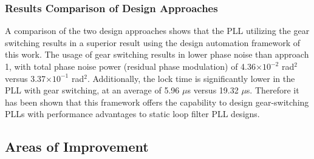 \subsubsection{Results Comparison of Design Approaches}
A comparison of the two design approaches shows that the PLL utilizing the gear switching results in a superior result using the design automation framework of this work. The usage of gear switching results in lower phase noise than approach 1, with total phase noise power (residual phase modulation) of 4.36$\times 10^{-2}$ rad$^2$ versus 3.37$\times 10^{-1}$ rad$^2$. Additionally, the lock time is significantly lower in the PLL with gear switching, at an average of 5.96 $\mu$s versus 19.32 $\mu$s. Therefore it has been shown that this framework offers the capability to design gear-switching PLLs with performance advantages to static loop filter PLL designs.




\FloatBarrier

\subsection{Areas of Improvement}


\FloatBarrier
